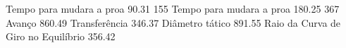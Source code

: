 Tempo para mudara a proa 90.31 155
Tempo para mudara a proa 180.25  367
Avanço 860.49
Transferência 346.37
Diâmetro tático 891.55
Raio da Curva de Giro no Equilíbrio 356.42

